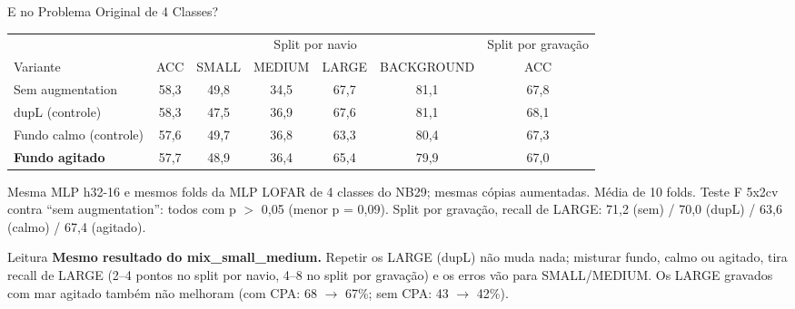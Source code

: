 \documentclass[aspectratio=169]{beamer}
\newcommand{\calo}[1]{\cellcolor{red!20}#1}
\begin{document}
\begin{frame}{E no Problema Original de 4 Classes?}
    \footnotesize
    \begin{table}
    \centering
    \scriptsize
    \setlength{\tabcolsep}{3.5pt}
    \begin{tabular}{lcccccc}
    \toprule
     & \multicolumn{5}{c}{Split por navio} & Split por gravação \\
    \cmidrule(lr){2-6}\cmidrule(lr){7-7}
    Variante & ACC & SMALL & MEDIUM & LARGE & BACKGROUND & ACC \\
    \midrule
    Sem augmentation & 58,3 & 49,8 & 34,5 & 67,7 & 81,1 & 67,8 \\
    dupL (controle) & 58,3 & 47,5 & 36,9 & 67,6 & 81,1 & 68,1 \\
    Fundo calmo (controle) & 57,6 & 49,7 & 36,8 & \calo{63,3} & 80,4 & 67,3 \\
    \textbf{Fundo agitado} & 57,7 & 48,9 & 36,4 & \calo{65,4} & 79,9 & 67,0 \\
    \bottomrule
    \end{tabular}
    \end{table}
    {\tiny Mesma MLP h32-16 e mesmos folds da MLP LOFAR de 4 classes do NB29; mesmas cópias aumentadas. Média de 10 folds. Teste F 5x2cv contra ``sem augmentation'': todos com p $>$ 0,05 (menor p = 0,09). Split por gravação, recall de LARGE: 71,2 (sem) / 70,0 (dupL) / 63,6 (calmo) / 67,4 (agitado).\par}
    \vspace{0.1cm}
    \begin{alertblock}{Leitura}
        \scriptsize
        \textbf{Mesmo resultado do mix\_small\_medium.} Repetir os LARGE (dupL) não muda nada; misturar fundo, calmo ou agitado, tira recall de LARGE (2--4 pontos no split por navio, 4--8 no split por gravação) e os erros vão para SMALL/MEDIUM. Os LARGE gravados com mar agitado também não melhoram (com CPA: 68 $\rightarrow$ 67\%; sem CPA: 43 $\rightarrow$ 42\%).
    \end{alertblock}
\end{frame}
\end{document}
